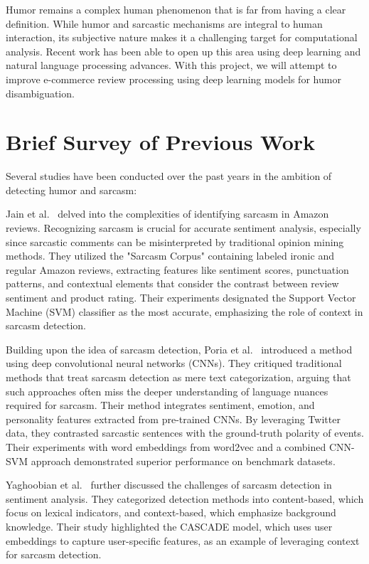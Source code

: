 \documentclass[10pt,twocolumn,letterpaper]{article}
\begin{document}
Humor remains a complex human phenomenon that is far from having a clear definition.
While humor and sarcastic mechanisms are integral to human interaction, its subjective nature makes it a challenging target for computational analysis.
Recent work has been able to open up this area using deep learning and natural language processing advances.
With this project, we will attempt to improve e-commerce review processing using deep learning models for humor disambiguation.


\section{Brief Survey of Previous Work}

Several studies have been conducted over the past years in the ambition of detecting humor and sarcasm:

Jain et al.~\cite{jain2019} delved into the complexities of identifying sarcasm in Amazon reviews. Recognizing sarcasm is crucial for accurate sentiment analysis, especially since sarcastic comments can be misinterpreted by traditional opinion mining methods. They utilized the "Sarcasm Corpus" containing labeled ironic and regular Amazon reviews, extracting features like sentiment scores, punctuation patterns, and contextual elements that consider the contrast between review sentiment and product rating. Their experiments designated the Support Vector Machine (SVM) classifier as the most accurate, emphasizing the role of context in sarcasm detection.

Building upon the idea of sarcasm detection, Poria et al.~\cite{poria2020} introduced a method using deep convolutional neural networks (CNNs). They critiqued traditional methods that treat sarcasm detection as mere text categorization, arguing that such approaches often miss the deeper understanding of language nuances required for sarcasm. Their method integrates sentiment, emotion, and personality features extracted from pre-trained CNNs. By leveraging Twitter data, they contrasted sarcastic sentences with the ground-truth polarity of events. Their experiments with word embeddings from word2vec and a combined CNN-SVM approach demonstrated superior performance on benchmark datasets.

Yaghoobian et al.~\cite{yaghoobian2020} further discussed the challenges of sarcasm detection in sentiment analysis. They categorized detection methods into content-based, which focus on lexical indicators, and context-based, which emphasize background knowledge. Their study highlighted the CASCADE model, which uses user embeddings to capture user-specific features, as an example of leveraging context for sarcasm detection.
\end{document}
